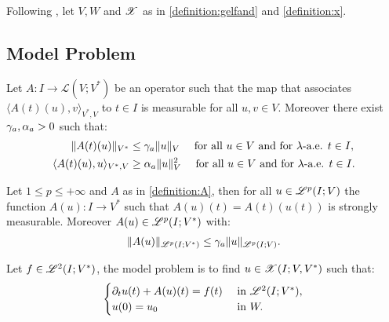 Following \cite[p. 124]{Ern2021}, let $V, W$ and $\mathscr{X}$ as in \cref{definition:gelfand} and \cref{definition:x}.

\subsection{Model Problem}

\begin{definition}[$A$] \label{definition:A} %
    Let $A \colon I \rightarrow \mathcal{L}(V;V^*)$ be an operator such that the map that associates $\langle A(t)(u), v \rangle_{V^*, V}$ to $t \in I$ is measurable for all $u, v \in V$. Moreover there exist $\gamma_{a}, \alpha_{a} > 0$ such that:
    \begin{align} \label{equation:a}
        \lVert A(t)(u) \rVert_{V^*} & \leq \gamma_{a} \lVert u \rVert_V \quad \text{ for all } u \in V \text{ and for } \lambda \text{-a.e. } t \in I, \\
        \langle A(t)(u), u \rangle_{V^*, V} & \geq \alpha_{a} \lVert u \rVert_V^2 \quad \text{ for all } u \in V \text{ and for } \lambda \text{-a.e. } t \in I.
    \end{align}
\end{definition}

\begin{lemma}
    Let $1 \leq p \leq +\infty$ and  $A$ as in \cref{definition:A}, then for all $u \in \mathscr{L}^{p}(I; V)$ the function $A(u) \colon I \rightarrow V^*$ such that $A(u)(t) = A(t)(u(t))$ is strongly measurable. Moreover $A(u) \in \mathscr{L}^{p}(I; V^*)$ with:
    \begin{gather}
        \lVert A(u) \rVert_{\mathscr{L}^{p}(I; V^*)} \leq \gamma_{a} \lVert u \rVert_{\mathscr{L}^{p}(I; V)}.
    \end{gather}
\end{lemma}

\begin{definition}
    Let $f \in \mathscr{L}^{2}(I; V^*)$, the model problem is to find $u \in \mathscr{X}(I; V, V^*)$ such that:
    \begin{gather}
        \begin{cases} \label{equation:model}
            \partial_t u(t) + A(u)(t) = f(t) & \text{ in } \mathscr{L}^{2}(I; V^*), \\
            u(0) = u_0 & \text{ in } W.
        \end{cases}
    \end{gather}
\end{definition}


